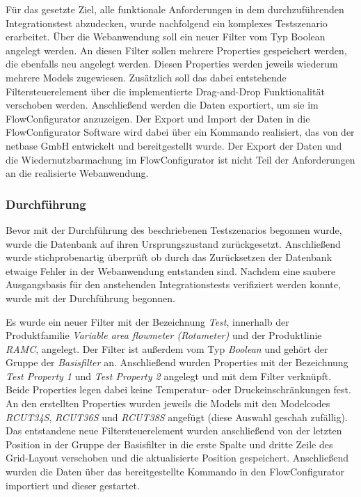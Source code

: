Für das gesetzte Ziel, alle funktionale Anforderungen in dem durchzuführenden Integrationstest abzudecken, wurde nachfolgend ein komplexes Testszenario erarbeitet.
Über die Webanwendung soll ein neuer Filter vom Typ Boolean angelegt werden. An diesen Filter sollen mehrere Properties gespeichert werden, die ebenfalls neu angelegt werden. Diesen Properties werden jeweils wiederum mehrere Models zugewiesen. Zusätzlich soll das dabei entstehende Filtersteuerelement über die implementierte Drag-and-Drop Funktionalität verschoben werden. Anschließend werden die Daten exportiert, um sie im FlowConfigurator anzuzeigen. Der Export und Import der Daten in die FlowConfigurator Software wird dabei über ein Kommando realisiert, das von der netbase GmbH entwickelt und bereitgestellt wurde. Der Export der Daten und die Wiedernutzbarmachung im FlowConfigurator ist nicht Teil der Anforderungen an die realisierte Webanwendung.

\subsubsection{Durchführung}

Bevor mit der Durchführung des beschriebenen Testszenarios begonnen wurde, wurde die Datenbank auf ihren Ursprungszustand zurückgesetzt. Anschließend wurde stichprobenartig überprüft ob durch das Zurücksetzen der Datenbank etwaige Fehler in der Webanwendung entstanden sind. Nachdem eine saubere Ausgangsbasis für den anstehenden Integrationstests verifiziert werden konnte, wurde mit der Durchführung begonnen.

Es wurde ein neuer Filter mit der Bezeichnung \emph{Test}, innerhalb der Produktfamilie \emph{Variable area flowmeter (Rotameter)} und der Produktlinie \emph{RAMC}, angelegt. Der Filter ist außerdem vom Typ \emph{Boolean} und gehört der Gruppe der \emph{Basisfilter} an. Anschließend wurden Properties mit der Bezeichnung \emph{Test Property 1} und \emph{Test Property 2} angelegt und mit dem Filter verknüpft. Beide Properties legen dabei keine Temperatur- oder Druckeinschränkungen fest. An den erstellten Properties wurden jeweils die Models mit den Modelcodes \emph{RCUT34S}, \emph{RCUT36S} und \emph{RCUT38S} angefügt (diese Auswahl geschah zufällig). Das entstandene neue Filtersteuerelement wurden anschließend von der letzten Position in der Gruppe der Basisfilter in die erste Spalte und dritte Zeile des Grid-Layout verschoben und die aktualisierte Position gespeichert. Anschließend wurden die Daten über das bereitgestellte Kommando in den FlowConfigurator importiert und dieser gestartet.

